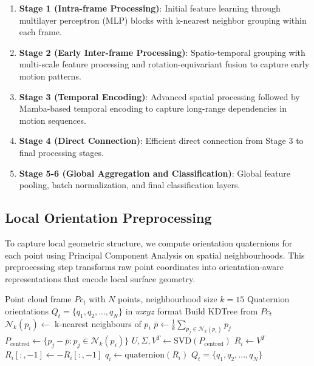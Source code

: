 \documentclass[journal]{IEEEtran}
\theoremstyle{plain}
\begin{document}
\begin{enumerate}
    \item \textbf{Stage 1 (Intra-frame Processing)}: Initial feature learning through multilayer perceptron (MLP) blocks with k-nearest neighbor grouping within each frame.
    \item \textbf{Stage 2 (Early Inter-frame Processing)}: Spatio-temporal grouping with multi-scale feature processing and rotation-equivariant fusion to capture early motion patterns.
    \item \textbf{Stage 3 (Temporal Encoding)}: Advanced spatial processing followed by Mamba-based temporal encoding to capture long-range dependencies in motion sequences.
    \item \textbf{Stage 4 (Direct Connection)}: Efficient direct connection from Stage 3 to final processing stages.
    \item \textbf{Stage 5-6 (Global Aggregation and Classification)}: Global feature pooling, batch normalization, and final classification layers.
\end{enumerate}

\subsection{Local Orientation Preprocessing}\label{sec:quaternion_preprocessing}

To capture local geometric structure, we compute orientation quaternions for each point using Principal Component Analysis on spatial neighbourhoods. This preprocessing step transforms raw point coordinates into orientation-aware representations that encode local surface geometry.

\begin{algorithm}[ht]
\caption{Local Orientation Estimation via PCA}
\label{alg:quaternion_preprocessing}
\begin{algorithmic}[1]
\Require Point cloud frame $Pc_t$ with $N$ points, neighbourhood size $k=15$
\Ensure Quaternion orientations $Q_t = \{q_1, q_2, ..., q_N\}$ in $wxyz$ format
    \State Build KDTree from $Pc_t$
    \State $\mathcal{N}_k(p_i) \gets$ k-nearest neighbours of $p_i$ 
    \State $\bar{p} \gets \frac{1}{k}\sum_{p_j \in \mathcal{N}_k(p_i)} p_j$ 
    \State $P_{\text{centred}} \gets \{p_j - \bar{p} : p_j \in \mathcal{N}_k(p_i)\}$ 
    \State $U, \Sigma, V^T \gets \text{SVD}(P_{\text{centred}})$ 
    \State $R_i \gets V^T$ 
        \State $R_i[:, -1] \gets -R_i[:, -1]$ 
    \EndIf
    \State $q_i \gets \text{quaternion}(R_i)$ 
\EndFor
\State \Return $Q_t = \{q_1, q_2, ..., q_N\}$
\end{algorithmic}
\end{algorithm}
\end{document}
